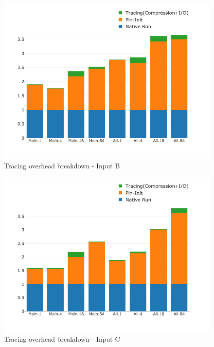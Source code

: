 \begin{figure}[]
\centering
\includegraphics[width=.75\textwidth]{parlot/figs.comet.newMed/comet_chartDet_B_wc_byTool_p3_5.png}
\caption{ Tracing overhead breakdown - Input B}
\label{comet_chartDet_B_wc_byTool_p3_5}
\end{figure}


\begin{figure}[]
\centering
\includegraphics[width=.75\textwidth]{parlot/figs.comet.newMed/comet_chartDet_C_wc_byTool_p3_5.png}
\caption{ Tracing overhead breakdown - Input C}
\label{comet_chartDet_C_wc_byTool_p3_5}
\end{figure}














